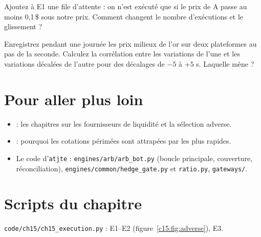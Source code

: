 \begin{exercise}[à coder]
Ajoutez à E1 une file d'attente : on n'est exécuté que si le prix de A passe au moins 0,1\,\$ sous notre prix. Comment changent le nombre d'exécutions et le glissement ?
\end{exercise}

\begin{exercise}
Enregistrez pendant une journée les prix milieux de l'or sur deux plateformes au pas de la seconde. Calculez la corrélation entre les variations de l'une et les variations décalées de l'autre pour des décalages de $-5$ à $+5$ s. Laquelle mène ?
\end{exercise}

\section{Pour aller plus loin}

\begin{toread}
\begin{itemize}[leftmargin=1.2em]
\item \citet{harris2003} : les chapitres sur les fournisseurs de liquidité et la sélection adverse.
\item \citet{budish2015} : pourquoi les cotations périmées sont \og attrapées\fg{} par les plus rapides.
\item Le code d'\texttt{atjte} \citep{atjte} : \texttt{engines/arb/arb\_bot.py} (boucle principale, couverture, réconciliation), \texttt{engines/common/hedge\_gate.py} et \texttt{ratio.py}, \texttt{gateways/}.
\end{itemize}
\end{toread}

\section{Scripts du chapitre}
\noindent\texttt{code/ch15/ch15\_execution.py} : E1–E2 (figure~\ref{c15:fig:adverse}), E3.
